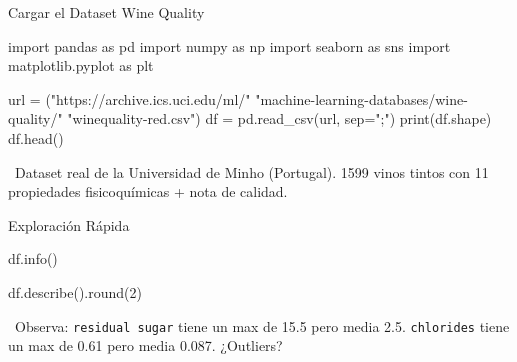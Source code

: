\documentclass[aspectratio=169, 11pt]{beamer}
\begin{document}
\begin{frame}[fragile,shrink=28]{Cargar el Dataset Wine Quality}
  \vspace{-6pt}
  \begin{pyblock}
import pandas as pd
import numpy as np
import seaborn as sns
import matplotlib.pyplot as plt

url = ("https://archive.ics.uci.edu/ml/"
       "machine-learning-databases/wine-quality/"
       "winequality-red.csv")
df = pd.read_csv(url, sep=";")
print(df.shape)
df.head()
  \end{pyblock}

  \vspace{4pt}
  {\scriptsize\color{textMuted}
    \faLightbulb\ Dataset real de la Universidad de Minho (Portugal).
    1599 vinos tintos con 11 propiedades fisicoquímicas + nota de calidad.}
\end{frame}

\begin{frame}[fragile,shrink=28]{Exploración Rápida}
  \vspace{-6pt}
  \begin{pyblock}
df.info()
  \end{pyblock}

  \vspace{2pt}
  \begin{pyblock}
df.describe().round(2)
  \end{pyblock}

  \vspace{4pt}
  {\scriptsize\color{textMuted}
    \faLightbulb\ Observa: \texttt{residual sugar} tiene un max de 15.5 pero media 2.5.
    \texttt{chlorides} tiene un max de 0.61 pero media 0.087.
    ¿Outliers?}
\end{frame}
\end{document}

